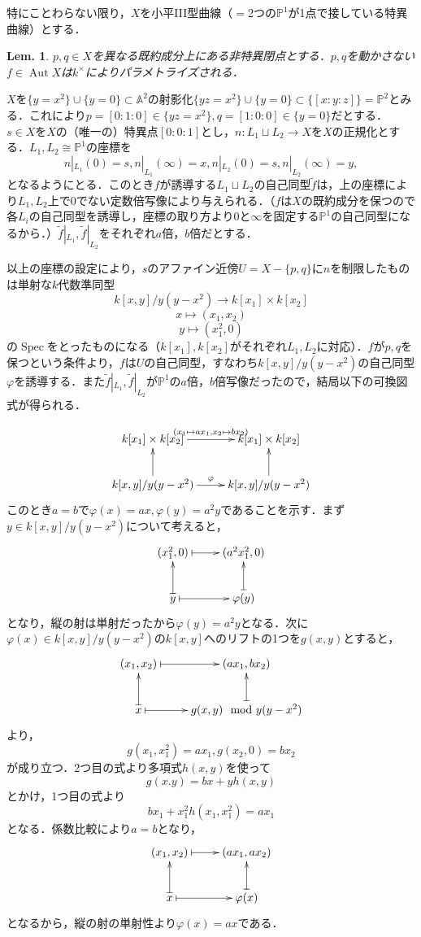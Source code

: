 \documentclass[uplatex,a4paper,11pt]{jsarticle}
\makeatletter
\theoremstyle{mystyle} %
\newtheorem{lemma}{Lem.}[section]
\renewenvironment{proof}[1][\proofname]{\par
 \pushQED{\qed}%
 \normalfont \topsep6\p@\@plus6\p@\relax
 \trivlist
 \item[\hskip\labelsep
 \itshape
 {\bf\underline{#1}}]\ignorespaces
}{%
 \popQED\endtrivlist\@endpefalse
}
\DeclareMathOperator{\Aut}{Aut}
\DeclareMathOperator{\Spec}{Spec}
\makeatother
\begin{document}
\title{}
\author{}
\date{}
特にことわらない限り，$X$を小平I\hspace{ - .1em}I\hspace{ - .1em}I型曲線（$=$2つの$\mathbb{P}^1$が1点で接している特異曲線）とする．
\begin{lemma}\label{auto_of_3}
	$p,q \in X$を異なる既約成分上にある非特異閉点とする．$p,q$を動かさない$f \in \Aut{X}$は$k^\times$によりパラメトライズされる．
\end{lemma}
\begin{proof}
	$X$を$\{y=x^2\}\cup\{y=0\} \subset \mathbb{A}^2$の射影化$\{yz=x^2\}\cup\{y=0\} \subset \{[x:y:z]\}=\mathbb{P}^2$とみる．これにより$p=[0:1:0] \in \{yz=x^2\}, q=[1:0:0] \in \{y=0\}$だとする．
	$s \in X$を$X$の（唯一の）特異点$[0:0:1]$とし，$n \colon L_1 \sqcup L_2 \to X$を$X$の正規化とする．$ L_1,L_2 \cong \mathbb{P}^1$の座標を$$n|_{L_1}(0)=s, n|_{L_1}(\infty)=x, n|_{L_2}(0)=s, n|_{L_2}(\infty)=y,$$となるようにとる．このとき$f$が誘導する$L_1 \sqcup L_2$の自己同型$\tilde{f}$は，上の座標により$L_1,L_2$上で$0$でない定数倍写像により与えられる．（$f$は$X$の既約成分を保つので各$L_i$の自己同型を誘導し，座標の取り方より$0$と$\infty$を固定する$\mathbb{P}^1$の自己同型になるから．）$\tilde{f}|_{L_1},\tilde{f}|_{L_2}$をそれぞれ$a$倍，$b$倍だとする．

	以上の座標の設定により，$s$のアファイン近傍$U=X - \{p,q\}$に$n$を制限したものは単射な$k$代数準同型
	$$k[x, y]/y(y - x^2) \to k[x_1]\times k[x_2]$$
	$$x \mapsto (x_1, x_2)$$
	$$y \mapsto (x_1^2, 0)$$
	の$\Spec$をとったものになる（$k[x_1],k[x_2]$がそれぞれ$L_1, L_2$に対応）．$f$が$p,q$を保つという条件より，$f$は$U$の自己同型，すなわち$k[x, y]/y(y - x^2)$の自己同型$\varphi$を誘導する．また$\tilde{f}|_{L_1},\tilde{f}|_{L_2}$が$\mathbb{P}^1$の$a$倍，$b$倍写像だったので，結局以下の可換図式が得られる．

	\[
		\xymatrix{
			k[x_1]\times k[x_2] \ar[r]^{(x_1 \mapsto ax_1, x_2 \mapsto bx_2)} & k[x_1]\times k[x_2]\\
			k[x, y]/y(y - x^2) \ar[u] \ar[r]^\varphi & k[x, y]/y(y - x^2) \ar[u]
		}
	\]
	このとき$a=b$で$\varphi(x)=ax, \varphi(y)=a^2y$であることを示す．まず$y \in k[x, y]/y(y - x^2)$について考えると，
	\[
		\xymatrix{
			(x_1^2,0) \ar@{|->}[r] & (a^2x_1^2, 0)\\
			y \ar@{|->}[u] \ar@{|->}[r] & \varphi(y) \ar@{|->}[u]
		}
	\]
	となり，縦の射は単射だったから$\varphi(y)=a^2y$となる．次に$\varphi(x) \in k[x,y]/y(y - x^2)$の$k[x,y]$へのリフトの1つを$g(x,y)$とすると，
	\[
		\xymatrix{
			(x_1,x_2) \ar@{|->}[r] & (ax_1, bx_2)\\
			x \ar@{|->}[u] \ar@{|->}[r] & g(x,y) \mod y(y - x^2) \ar@{|->}[u]
		}
	\]
	より，$$g(x_1,x_1^2)=ax_1, g(x_2, 0) = bx_2$$が成り立つ．2つ目の式より多項式$h(x,y)$を使って$$g(x.y)=bx + yh(x,y)$$とかけ，1つ目の式より$$bx_1 + x_1^2h(x_1,x_1^2)=ax_1$$となる．係数比較により$a=b$となり，\[
		\xymatrix{
			(x_1,x_2) \ar@{|->}[r] & (ax_1, ax_2)\\
			x \ar@{|->}[u] \ar@{|->}[r] & \varphi(x) \ar@{|->}[u]
		}
	\]
	となるから，縦の射の単射性より$\varphi(x)=ax$である．
\end{proof}
\end{document}
